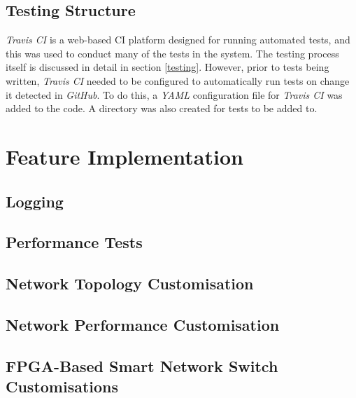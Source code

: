 \subsection{Testing Structure}
\label{testing_structure}
\textit{Travis CI} \cite{travis_ci} is a web-based CI platform designed for running automated tests, and this was used to conduct many of the tests in the system.
The testing process itself is discussed in detail in section \ref{testing}.
However, prior to tests being written, \textit{Travis CI} needed to be configured to automatically run tests on change it detected in \textit{GitHub}.
To do this, a \textit{YAML} configuration file for \textit{Travis CI} was added to the code.
A directory was also created for tests to be added to.

\section{Feature Implementation}
\label{features}

\subsection{Logging}
\label{logging}

\subsection{Performance Tests}
\label{performance_tests}

%
\subsection{Network Topology Customisation}
\label{network_topology_customisation}

\subsection{Network Performance Customisation}
\label{network_performance_customisation}



\subsection{FPGA-Based Smart Network Switch Customisations}
\label{FPGA_Based_Smart_Network_Switch_Customisations}


